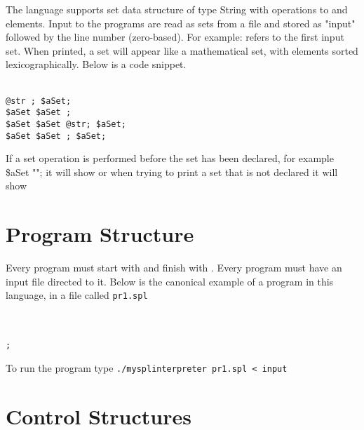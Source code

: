 \documentclass[11pt]{article}
\begin{document}
The language supports set data structure of type String with operations to \ADD and \REMOVE elements. Input to the programs are read as sets from a file and stored as "input" followed by the line number (zero-based). For example: \INPUT refers to the first input set.  When printed, a set will appear like a mathematical set, with elements sorted lexicographically. Below is a code snippet. 

\begin{texto}
	\texttt{\\
		\LET @str \ASS {}; 
		\LET \$aSet;  \\
		\$aSet \ASS \$aSet \ADD {}; \\
		\$aSet \ASS \$aSet \ADD @str; \PRINT \$aSet; \\
		\$aSet \ASS \$aSet \REMOVE {}; \PRINT \$aSet; 
	 }
\end{texto}

If a set operation is performed before the set has been declared, for example \$aSet \ADD ""; it will show  or when trying to print a set that is not declared it will show 

\section{Program Structure}

Every program must start with \BEGIN and finish with \END. Every program must have an input file directed to it. Below is the canonical example of a program in this language, in a file called \texttt{pr1.spl}

\begin{texto}
	\texttt{\\
		\BEGIN \\
		\tab	 \PRINT {}; \\
		\END
	 }
\end{texto}

To run the program type \texttt{./mysplinterpreter pr1.spl < input}

\section{Control Structures}
\end{document}
